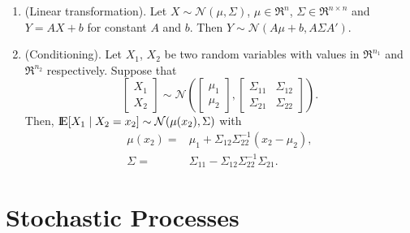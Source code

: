 \documentclass[a4paper,10pt]{article}
\begin{document}
\begin{enumerate}
 
 \item (Linear transformation). Let $X\sim \mathcal{N}(\mu,\Sigma)$, $\mu\in\Re^n$, $\Sigma\in\Re^{n\times n}$ 
       and $Y=AX+b$ for constant $A$ and $b$. Then $Y\sim \mathcal{N}(A\mu+b, A\Sigma A')$.
 \item (Conditioning). Let $X_1$, $X_2$ be two random variables with values in $\Re^{n_1}$ and $\Re^{n_2}$
       respectively. Suppose that
\begin{equation*}
        \begin{bmatrix}
         X_1\\X_2
        \end{bmatrix}
{}\sim{}
	\mathcal{N}\left(
	\begin{bmatrix}
         \mu_1\\\mu_2
        \end{bmatrix},
        \begin{bmatrix}
         \Sigma_{11} & \Sigma_{12}\\
         \Sigma_{21} & \Sigma_{22}
        \end{bmatrix}
        \right).
\end{equation*}
Then, \(\E[X_1\mid X_2=x_2] \sim \mathcal{N}(\mu(x_2), \Sigma)\) with 
\begin{align*}
	\mu(x_2) 
{}={}& 
	\mu_1 
{}+{}
	\Sigma_{12}\Sigma_{22}^{-1}(x_2{}-{}\mu_2),
\\
	\Sigma 
{}={}&
	\Sigma_{11}
{}-{}
	\Sigma_{12}\Sigma_{22}^{-1}\Sigma_{21}.
\end{align*}

\end{enumerate}


\section{Stochastic Processes}
\end{document}
